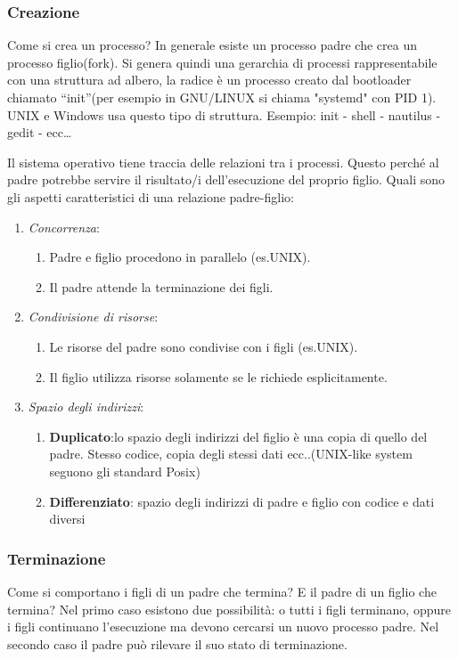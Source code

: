 \documentclass{article}
\begin{document}
\subsubsection{Creazione}
Come si crea un processo? In generale esiste un processo padre che crea un
processo figlio(fork). Si genera quindi una gerarchia di processi 
rappresentabile con una struttura ad albero, la radice è un processo creato 
dal bootloader chiamato “init”(per esempio in GNU/LINUX si chiama "systemd" con PID 1).  UNIX e Windows usa questo tipo di struttura.
Esempio: init - shell - nautilus - gedit - ecc…

\noindent Il sistema operativo tiene traccia delle relazioni tra i processi. Questo 
perché al padre potrebbe servire il risultato/i dell'esecuzione del proprio 
figlio. 
Quali sono gli aspetti caratteristici di una relazione padre-figlio:
\begin{enumerate}
    \item \textit{Concorrenza}:
        \begin{enumerate}
            \item Padre e figlio procedono in parallelo (es.UNIX).
            \item Il padre attende la terminazione dei figli.
        \end{enumerate}
    \item \textit{Condivisione di risorse}:
        \begin{enumerate}
            \item Le risorse del padre sono condivise con i figli (es.UNIX). 
            \item Il figlio utilizza risorse solamente se le richiede esplicitamente.
        \end{enumerate}
    \item \textit{Spazio degli indirizzi}:
        \begin{enumerate}
            \item \textbf{Duplicato}:lo spazio degli indirizzi del figlio è 
            una copia di quello del padre. Stesso codice, copia degli stessi dati
            ecc..(UNIX-like system seguono gli standard Posix)
            \item \textbf{Differenziato}: spazio degli indirizzi di padre 
            e figlio con codice e dati diversi
        \end{enumerate}
\end{enumerate}

\subsubsection{Terminazione}
Come si comportano i figli di un padre che termina? E il padre di un figlio 
che termina?
Nel primo caso esistono due possibilità: o tutti i figli terminano, oppure
i figli continuano l'esecuzione ma devono cercarsi un nuovo processo padre.
Nel secondo caso il padre può rilevare il suo stato di terminazione.
\end{document}
